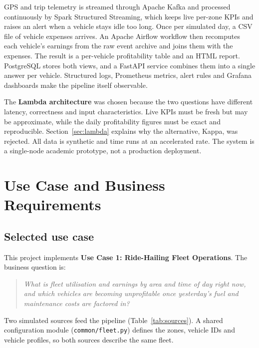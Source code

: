 \documentclass[11pt,a4paper]{article}
\newcommand{\code}[1]{\texttt{\small #1}}
\begin{document}
GPS and trip telemetry is streamed through Apache Kafka and processed continuously by Spark
Structured Streaming, which keeps live per-zone KPIs and raises an alert when a vehicle stays
idle too long. Once per simulated day, a CSV file of vehicle expenses arrives. An Apache Airflow
workflow then recomputes each vehicle's earnings from the raw event archive and joins them with
the expenses. The result is a per-vehicle profitability table and an HTML report. PostgreSQL
stores both views, and a FastAPI service combines them into a single answer per vehicle.
Structured logs, Prometheus metrics, alert rules and Grafana dashboards make the pipeline itself
observable.

The \textbf{Lambda architecture} was chosen because the two questions have different latency,
correctness and input characteristics. Live KPIs must be fresh but may be approximate, while the
daily profitability figures must be exact and reproducible. Section~\ref{sec:lambda} explains why
the alternative, Kappa, was rejected. All data is synthetic and time runs at an accelerated rate.
The system is a single-node academic prototype, not a production deployment.

\section{Use Case and Business Requirements}

\subsection{Selected use case}

This project implements \textbf{Use Case 1: Ride-Hailing Fleet Operations}. The business question
is:

\begin{quote}\itshape
What is fleet utilisation and earnings by area and time of day right now, and which vehicles are
becoming unprofitable once yesterday's fuel and maintenance costs are factored in?
\end{quote}

\noindent Two simulated sources feed the pipeline (Table~\ref{tab:sources}). A shared
configuration module (\code{common/fleet.py}) defines the zones, vehicle IDs and vehicle
profiles, so both sources describe the same fleet.
\end{document}

